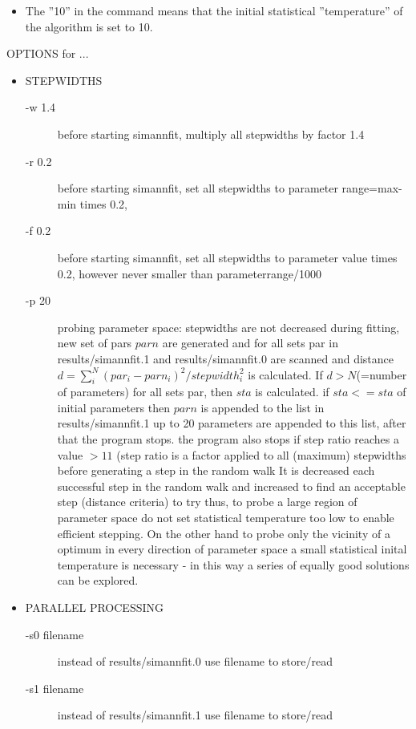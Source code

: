 \begin{itemize}
\item
The ''10'' in the command means that the initial statistical
''temperature'' of the algorithm
is set to 10.  
\end{itemize}

 OPTIONS for ...
\begin{itemize}
\item STEPWIDTHS
\begin{description}
\item[-w 1.4]  before starting simannfit, multiply all stepwidths by factor 1.4 
\item[-r 0.2] before starting simannfit, set all stepwidths to parameter 
            range=max-min times 0.2, 
\item[-f 0.2] before starting simannfit, set all stepwidths to parameter value 
            times 0.2, however never smaller than parameterrange/1000 
\item[-p 20] probing parameter space: stepwidths are not decreased during
	    fitting, new set of pars $parn$ are generated and for all sets par in 
	    {\prg results/simannfit.1} and {\prg results/simannfit.0} are scanned and
	    distance $d=\sum_i^N (par_i-parn_i)^2/stepwidth_i^2$ is calculated. If
$d>N $(=number of parameters)
	    for all sets par, then $sta$ is calculated. if  $sta<=sta$ of initial parameters
	    then $parn$ is appended to the list in {\prg results/simannfit.1}
	    up to 20 parameters are appended to this list, after that the program stops.
	    the program also stops if step ratio reaches a value $> 11$ (step ratio 
	    is a factor applied to all (maximum) stepwidths before generating a step in the random walk
	    It is decreased each successful step in the random walk and increased to find an
	    acceptable step (distance criteria) to try
	    thus, to probe a large region of parameter space do not set statistical
	    temperature too low to enable efficient stepping. On the other hand to
	    probe only the vicinity of a optimum in every direction of parameter
	    space a small statistical inital temperature is necessary
	    - in this way a series of equally good solutions can be explored.
\end{description}
\item  PARALLEL PROCESSING
\begin{description}\item[-s0 filename] instead of results/simannfit.0 use filename to store/read 
\item[-s1 filename] instead of results/simannfit.1 use filename to store/read 

\end{description}
\end{itemize}
